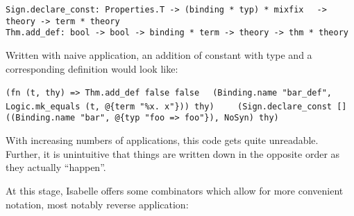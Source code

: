 \begin{isabellebody}
\begin{isamarkuptext}
  \smallskip\begin{mldecls}
  \verb|Sign.declare_const: Properties.T -> (binding * typ) * mixfix|\isasep\isanewline%
\verb|  -> theory -> term * theory| \\
  \verb|Thm.add_def: bool -> bool -> binding * term -> theory -> thm * theory|
  \end{mldecls}

  \noindent Written with naive application, an addition of constant
   with type  and
  a corresponding definition  would look like:

  \smallskip\begin{mldecls}
  \verb|(fn (t, thy) => Thm.add_def false false|\isasep\isanewline%
\verb|  (Binding.name "bar_def", Logic.mk_equals (t, @{term "%x. x"})) thy)|\isasep\isanewline%
\verb|    (Sign.declare_const []|\isasep\isanewline%
\verb|      ((Binding.name "bar", @{typ "foo => foo"}), NoSyn) thy)|
  \end{mldecls}

  \noindent With increasing numbers of applications, this code gets quite
  unreadable.  Further, it is unintuitive that things are
  written down in the opposite order as they actually ``happen''.%
\end{isamarkuptext}%
\isamarkuptrue%
%
\begin{isamarkuptext}%
\noindent At this stage, Isabelle offers some combinators which allow
  for more convenient notation, most notably reverse application:


\end{isamarkuptext}
\end{isabellebody}

